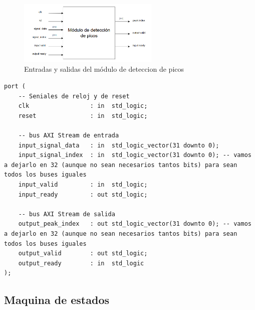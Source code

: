     \begin{figure}[h!]
        \centering
        \includegraphics[width=0.6\textwidth]{./Images/img_implementacion_hw/moddeteccionpicos.png}
        \caption{Entradas y salidas del módulo de deteccion de picos}
        \label{fig:moddeteccionpicos}
    \end{figure} 
    
\lstset{language=VHDL, breaklines=true, basicstyle=\footnotesize}
\begin{lstlisting}[frame=single] 
port (
    -- Seniales de reloj y de reset
    clk                 : in  std_logic;
    reset               : in  std_logic; 
    
    -- bus AXI Stream de entrada
    input_signal_data   : in  std_logic_vector(31 downto 0);
    input_signal_index  : in  std_logic_vector(31 downto 0); -- vamos a dejarlo en 32 (aunque no sean necesarios tantos bits) para sean todos los buses iguales
    input_valid         : in  std_logic;
    input_ready         : out std_logic;
    
    -- bus AXI Stream de salida
    output_peak_index   : out std_logic_vector(31 downto 0); -- vamos a dejarlo en 32 (aunque no sean necesarios tantos bits) para sean todos los buses iguales
    output_valid        : out std_logic;
    output_ready        : in  std_logic   
);
\end{lstlisting}
\subsection{Maquina de estados}


